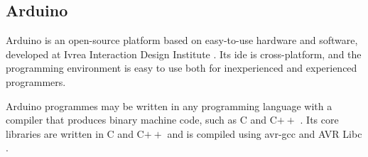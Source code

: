 \subsection{Arduino}
\label{sec:progplatarduino}
Arduino is an open-source platform based on easy-to-use hardware and software, developed at Ivrea Interaction Design Institute  \cite{arduino2}. Its \acrfull{ide} is cross-platform, and the programming environment is easy to use both for inexperienced and experienced programmers.

Arduino programmes may be written in any programming language with a compiler that produces binary machine code, such as C and C$++$ \cite{arduino}. Its core libraries are written in C and C$++$ and is compiled using avr-gcc and AVR Libc \cite{arduinobuild}.